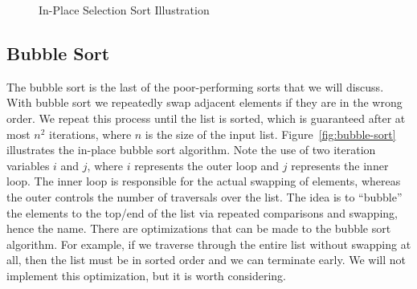 \begin{figure}[tp]
\caption{In-Place Selection Sort Illustration}
\end{figure}

\subsection{Bubble Sort}
The bubble sort is the last of the poor-performing sorts that we will discuss. With bubble sort we repeatedly swap adjacent elements if they are in the wrong order. We repeat this process until the list is sorted, which is guaranteed after at most $n^2$ iterations, where $n$ is the size of the input list. Figure~\ref{fig:bubble-sort} illustrates the in-place bubble sort algorithm. Note the use of two iteration variables $i$ and $j$, where $i$ represents the outer loop and $j$ represents the inner loop. The inner loop is responsible for the actual swapping of elements, whereas the outer controls the number of traversals over the list. The idea is to ``bubble'' the elements to the top/end of the list via repeated comparisons and swapping, hence the name. There are optimizations that can be made to the bubble sort algorithm. For example, if we traverse through the entire list without swapping at all, then the list must be in sorted order and we can terminate early. We will not implement this optimization, but it is worth considering.

